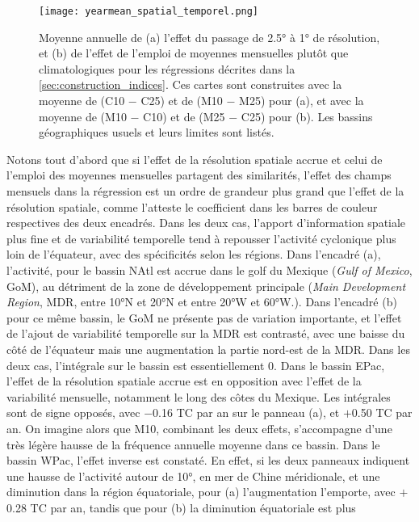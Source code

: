 \documentclass[../main.tex]{subfiles}
\begin{document}
\begin{figure}[tb]
    \centering
    \texttt{[image: yearmean\_spatial\_temporel.png]}
    \caption{Moyenne annuelle de (a) l'effet du passage de \ang{2.5} à \ang{1} de résolution, et (b) de l'effet de l'emploi de moyennes mensuelles plutôt que
    climatologiques pour les régressions décrites dans la \cref{sec:construction_indices}. Ces cartes sont construites avec la moyenne de (C10 $-$ C25) et de
    (M10 $-$ M25) pour (a), et avec la moyenne de (M10 $-$ C10) et de (M25 $-$ C25) pour (b). Les bassins géographiques usuels et leurs limites sont listés.}
    \label{fig:impact_spatial_temporel}
\end{figure}

Notons tout d'abord que si l'effet de la résolution spatiale accrue et celui de l'emploi des moyennes mensuelles partagent des similarités, l'effet des champs
mensuels dans la régression est un ordre de grandeur plus grand que l'effet de la résolution spatiale, comme l'atteste le coefficient dans les barres de couleur
respectives des deux encadrés. Dans les deux cas, l'apport d'information spatiale plus fine et de variabilité temporelle tend à repousser l'activité cyclonique
plus loin de l'équateur, avec des spécificités selon les régions. Dans l'encadré (a), l'activité, pour le bassin NAtl est accrue dans le golf du Mexique
(\textit{Gulf of Mexico}, GoM), au détriment de la zone de développement principale (\textit{Main Development Region}, MDR, entre \ang{10}N et \ang{20}N et
entre \ang{20}W et \ang{60}W.). Dans l'encadré (b) pour ce même bassin, le GoM ne présente pas de variation importante, et l'effet de l'ajout de variabilité
temporelle sur la MDR est contrasté, avec une baisse du côté de l'équateur mais une augmentation la partie nord-est de la MDR. Dans les deux cas, l'intégrale
sur le bassin est essentiellement \num{0}. Dans le bassin EPac, l'effet de la résolution spatiale accrue est en opposition avec l'effet de la variabilité
mensuelle, notamment le long des côtes du Mexique. Les intégrales sont de signe opposés, avec \num{-0.16} TC par an sur le panneau (a), et $+$\num{0.50} TC par
an. On imagine alors que M10, combinant les deux effets, s'accompagne d'une très légère hausse de la fréquence annuelle moyenne dans ce bassin. Dans le bassin
WPac, l'effet inverse est constaté. En effet, si les deux panneaux indiquent une hausse de l'activité autour de \ang{10}, en mer de Chine méridionale, et une
diminution dans la région équatoriale, pour (a) l'augmentation l'emporte, avec $+$\num{0.28} TC par an, tandis que pour (b) la diminution équatoriale est plus
\end{document}

